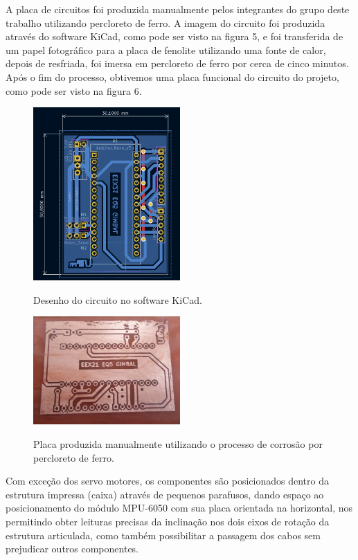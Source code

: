 A placa de circuitos foi produzida manualmente pelos integrantes do grupo deste trabalho utilizando percloreto de ferro. A imagem do circuito foi produzida através do software KiCad, como pode ser visto na figura 5, e foi transferida de um papel fotográfico para a placa de fenolite utilizando uma fonte de calor, depois de resfriada, foi imersa em percloreto de ferro por cerca de cinco minutos. Após o fim do processo, obtivemos uma placa funcional do circuito do projeto, como pode ser visto na figura 6.

\begin{figure}[H]
\centering
\includegraphics[width=0.5\textwidth]{Capitulo2 - Hardware/Circuito placa desenho.PNG}\\
\caption{\label{fig:widgets}Desenho do circuito no software KiCad.}
\end{figure}

\begin{figure}[H]
\centering
\includegraphics[width=0.5\textwidth]{Capitulo2 - Hardware/CircuitoPlaca.jpeg}\\
\caption{\label{fig:widgets}Placa produzida manualmente utilizando o processo de corrosão por percloreto de ferro.}
\end{figure}

Com exceção dos servo motores, os componentes são posicionados dentro da estrutura impressa (caixa) através de pequenos parafusos, dando espaço ao posicionamento do módulo MPU-6050 com sua placa orientada na horizontal, nos permitindo obter leituras precisas da inclinação nos dois eixos de rotação da estrutura articulada, como também possibilitar a passagem dos cabos sem prejudicar outros componentes. 